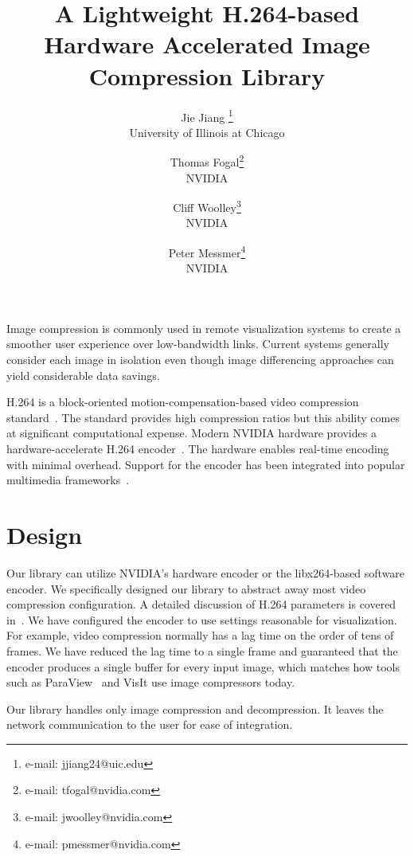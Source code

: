 \documentclass[review]{vgtc}                 %
\title{A Lightweight H.264-based Hardware Accelerated Image Compression Library}
\author{Jie Jiang \thanks{e-mail: jjiang24@uic.edu}\\ %
        \scriptsize University of Illinois at Chicago %
\and Thomas Fogal\thanks{e-mail: tfogal@nvidia.com}\\ %
     \scriptsize NVIDIA %
\and Cliff Woolley\thanks{e-mail: jwoolley@nvidia.com}\\ %
     \scriptsize NVIDIA %
\and Peter Messmer\thanks{e-mail: pmessmer@nvidia.com}\\ %
     \scriptsize NVIDIA} %
\begin{document}


\maketitle

Image compression is commonly used in remote visualization systems to
create a smoother user experience over low-bandwidth links. Current
systems generally consider each image in isolation even though image
differencing approaches can yield considerable data savings.

H.264 is a block-oriented motion-compensation-based video compression
standard~\cite{wiegand2003overview}. The standard provides high
compression ratios but this ability comes at significant computational
expense.  Modern NVIDIA hardware provides a hardware-accelerate H.264
encoder~\cite{nvcodec}.  The hardware enables real-time encoding with
minimal overhead. Support for the encoder has been
integrated into popular multimedia frameworks~\cite{ffmpeg}.

\section{Design}

Our library can utilize NVIDIA's hardware encoder or the libx264-based
software encoder. We specifically designed our library to abstract away
most video compression configuration. A detailed discussion of
H.264 parameters is covered in~\cite{wiegand2003overview}. We have configured
the encoder to use settings reasonable for visualization. For example, video
compression normally has a lag time on the order of tens of frames. We have
reduced the lag time to a single frame and guaranteed that the encoder produces
a single buffer for every input image, which matches how tools such as 
ParaView~\cite{henderson2004paraview} and VisIt use image compressors today.

Our library handles only image compression and decompression. It leaves the
network communication to the user for ease of integration.
\end{document}
